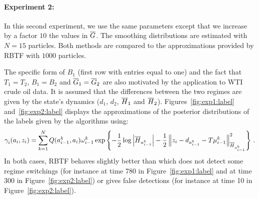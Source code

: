 \paragraph{Experiment 2:}
In this second experiment, we use the same parameters except that we increase by a factor $10$ the values in $\barG$.
The smoothing distributions are estimated with $N=15$ particles. Both methods are compared to the approximations provided by RBTF with $1000$ particles.

\medskip



The specific form of $B_1$ (first row with entries equal to one) and the fact that $T_1 = T_2$, $B_1 = B_2 $ and $\barG_1 = \barG_2$ are also motivated by the application to WTI crude oil data.  It is assumed that the differences between the two regimes are given by the state's dynamics ($d_1$, $d_2$, $\barH_1$ and $\barH_2$). Figures~\ref{fig:exp1:label} and~\ref{fig:exp2:label} displays the approximations of the  posterior distributions of the labels given by the algorithms using:
\[
\gamma^{}_i (a_i, z_i) = \sum_{k=1}^{N} Q(a^{k}_{i-1},a_i) \omega^{k}_{i-1} \exp\left\{ -\frac{1}{2} \log \left|\barH_{a^k_{i-1}} \right| -\frac{1}{2}\normMat{\barH_{a^k_{i-1}}}{z_i - d_{a^k_{i-1}} -T \mu^k_{i-1} }^2\right\} \eqsp.
\]
In both cases, RBTF behaves slightly better than \cite{briers:doucet:maskell:2010} which does not detect some regime switchings (for instance  at time 780 in Figure~\ref{fig:exp1:label} and at time 300 in Figure~\ref{fig:exp2:label}) or gives false detections (for instance at time 10 in Figure~\ref{fig:exp2:label}).

